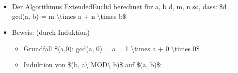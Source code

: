 \documentclass[a4paper]{article}
\begin{document}
\begin{multicols}{3}
\begin{itemize}
              \begin{itemize}
                  \item
                        Der Algorithmus ExtendedEuclid berechnet für a, b d, m, n so, dass:
                        \$d = gcd(a, b) = m \textbackslash times a + n \textbackslash times
                        b\$
              \end{itemize}


              \begin{itemize}
                  \item
                        Beweis: (durch Induktion)

                        \begin{itemize}
                            \item
                                  Grundfall \$(a,0): gcd(a, 0) = a = 1 \textbackslash times a + 0
                                  \textbackslash times 0\$
                            \item
                                  Induktion von \$(b, a\textbackslash{} MOD\textbackslash{} b)\$ auf
                                  \$(a, b)\$:


\end{itemize}
\end{itemize}
\end{itemize}
\end{multicols}
\end{document}
